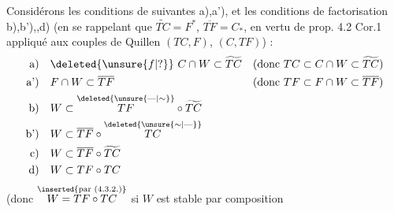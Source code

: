 Considérons les conditions de   suivantes a),a'), et les conditions de factorisation b),b'),,d) (en se rappelant que $\widetilde{TC}=F^*$, $\overline{TF}=C_*$, en vertu de prop. 4.2 Cor.1 appliqué aux couples de Quillen $(TC,F)$, $(C,TF)$) :
\[
\begin{aligned}
\text{a)}\quad&\deleted{\unsure{f|?}}\ C\cap W\subset\widetilde{TC}
&&\text{(donc }TC\subset C\cap W\subset\widetilde{TC}\text{)}\\
\text{a')}\quad&F\cap W\subset\overline{TF}
&&\text{(donc }TF\subset F\cap W\subset\overline{TF}\text{)}\\
\text{b)}\quad&W\subset\overset{\deleted{\unsure{\text{---}|\sim}}}{TF}\circ\widetilde{TC}\\
\text{b')}\quad&W\subset\overline{TF}\circ\overset{\deleted{\unsure{\sim|\text{---}}}}{TC}\\
\text{c)}\quad&W\subset\overline{TF}\circ\widetilde{TC}\\
\text{d)}\quad&W\subset TF\circ TC
\end{aligned}
\]
(donc $\overset{\inserted{\text{par }(4.3.2.)}}{W=TF\circ TC}$ si $W$ est stable par composition
